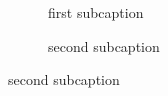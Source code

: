 \documentclass[11pt]{article}
\begin{document}
\begin{figure}
    \begin{subfigure}{.5\textwidth}
        \caption{first subcaption}
    \end{subfigure}
    \begin{subfigure}{.5\textwidth}
        \caption{second subcaption}
    \end{subfigure}
\end{figure}
\end{document}
